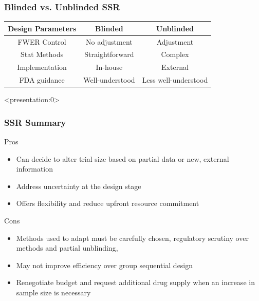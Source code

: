 \documentclass{beamer}
\begin{document}
\begin{frame}
	\frametitle{Blinded vs. Unblinded SSR}
\begin{table}[ht]
	\renewcommand{\arraystretch}{1.25}
	\centering
	\begin{tabular}{ccc}
		Design Parameters & Blinded & Unblinded		\\ \hline
		FWER Control & No adjustment & Adjustment \\
		Stat Methods & Straightforward & Complex \\		
		Implementation & In-house & External \\ 
		FDA guidance & Well-understood & Less well-understood \\\hline
	\end{tabular}
\end{table}	
\end{frame}


\begin{frame}<presentation:0>
	\frametitle{SSR Summary}
Pros
	\begin{itemize}
		\item Can decide to alter trial size based on partial data or new, external information
		\item Address uncertainty at the design stage
		\item Offers flexibility and reduce upfront resource commitment
		\end{itemize}
Cons \begin{itemize}		
		\item Methods used to adapt must be carefully chosen, regulatory scrutiny over methods and partial unblinding, 
		\item May not improve efficiency over group sequential design
		\item Renegotiate budget and request additional drug supply when an increase in sample size is necessary
	\end{itemize}
\end{frame}\addtocounter{framenumber}{-1}
\end{document}
